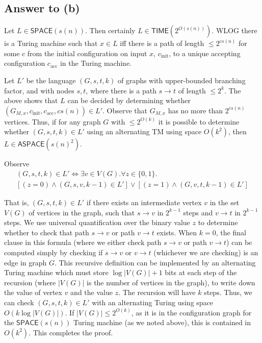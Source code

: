 \documentclass{article}
\newcommand{\TIME}{\mathbf{TIME}}
\def \ASPACE{{\mathsf{ASPACE}}}
\def \SPACE{{\mathsf{SPACE}}}
\def \TIME{{\mathsf{TIME}}}
\begin{document}

\subsection*{Answer to (b)}

Let $L \in \SPACE(s(n))$.  Then certainly $L \in \TIME(2^{O(s(n))})$.
WLOG there is a Turing machine such that $x \in L$ iff there is a path of length $\leq 2^{c s(n)}$ for some $c$ from the initial configuration on input $x$, $c_\text{init}$, to a unique accepting configuration $c_\text{acc}$ in the Turing machine.

Let $L'$ be the language $(G, s, t, k)$ of graphs with upper-bounded branching factor, and with nodes $s, t$, where there is a path $s \to t$ of length $\leq 2^k$.  The above shows that $L$ can be decided by determining whether $(G_{M, x}, c_\text{init}, c_\text{acc}, c s(n)) \in L'$.  Observe that $G_{M, x}$ has no more than $2^{c s(n)}$ vertices.  Thus, if for any graph $G$ with $\leq 2^{O(k)}$ it is possible to determine whether $(G, s, t, k) \in L'$ using an alternating TM using space $O(k^2)$, then $L \in \ASPACE(s(n)^2)$.

Observe
\begin{multline*}
(G, s, t, k) \in L' \iff
\exists v \in V(G) .
\forall z \in \{0, 1\} . \\
[(z = 0) \wedge (G, s, v, k - 1) \in L'] \vee
[(z = 1) \wedge (G, v, t, k - 1) \in L']
\end{multline*}

That is, $(G, s, t, k) \in L'$ if there exists an intermediate vertex $v$ in the set $V(G)$ of vertices in the graph, such that $s \to v$ in $2^{k - 1}$ steps and $v \to t$ in $2^{k - 1}$ steps.  We use universal quantification over the binary value $z$ to determine whether to check that path $s \to v$ or path $v \to t$ exists.
When $k = 0$, the final clause in this formula (where we either check path $s \to v$ or path $v \to t$) can be computed simply by checking if $s \to v$ or $v \to t$ (whichever we are checking) is an edge in graph $G$.
This recursive definition can be implemented by an alternating Turing machine which must store $\log |V(G)| + 1$ bits at each step of the recursion (where $|V(G)|$ is the number of vertices in the graph), to write down the value of vertex $v$ and the value $z$.  The recursion will have $k$ steps.  Thus, we can check $(G, s, t, k) \in L'$ with an alternating Turing using space $O(k \log |V(G)|)$.  If $|V(G)| \leq 2^{O(k)}$, as it is in the configuration graph for the $\SPACE(s(n))$ Turing machine (as we noted above), this is contained in $O(k^2)$.  This completes the proof.
\end{document}
